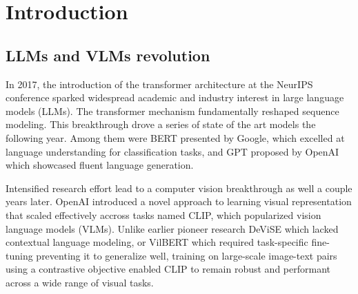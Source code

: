 \documentclass[12pt,twoside]{report}
\date{June 2025}
\begin{document}



\pagestyle{fancy}
\setcounter{page}{1}







\cleardoublepage
{}
\setcounter{page}{1}

\chapter{Introduction}
\section{LLMs and VLMs revolution}
In 2017, the introduction of the transformer architecture\cite{AttentionIsAllYouNeed} at the NeurIPS conference sparked widespread academic and industry interest in large language models (LLMs). The transformer mechanism fundamentally reshaped sequence modeling. This breakthrough drove a series of state of the art models the following year. Among them were BERT\cite{BERT} presented by Google, which excelled at language understanding for classification tasks, and GPT\cite{GPT} proposed by OpenAI which showcased fluent language generation.

Intensified research effort lead to a computer vision breakthrough as well a couple years later. OpenAI introduced a novel approach to learning visual representation that scaled effectively accross tasks named CLIP\cite{CLIP}, which popularized vision language models (VLMs). Unlike earlier pioneer research DeViSE\cite{DeViSE} which lacked contextual language modeling, or VilBERT\cite{ViLBERT} which required task-specific fine-tuning preventing it to generalize well, training on large-scale image-text pairs using a contrastive objective enabled CLIP to remain robust and performant across a wide range of visual tasks.
\end{document}
